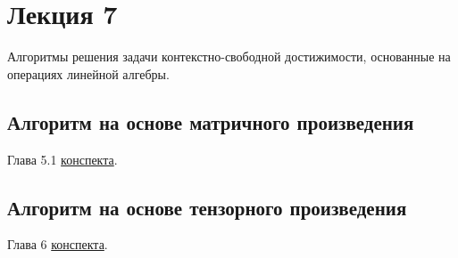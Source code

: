 \section{Лекция 7}
 
Алгоритмы решения задачи контекстно-свободной достижимости, основанные на операциях линейной алгебры.

\subsection{Алгоритм на основе матричного произведения}

Глава 5.1 \href{https://github.com/YaccConstructor/articles/blob/master/InProgress/Formal_langs_CFPQ_course_notes/Formal_lang_CFPQ_course_notes.pdf}{конспекта}.

\subsection{Алгоритм на основе тензорного произведения}

Глава 6 \href{https://github.com/YaccConstructor/articles/blob/master/InProgress/Formal_langs_CFPQ_course_notes/Formal_lang_CFPQ_course_notes.pdf}{конспекта}.
